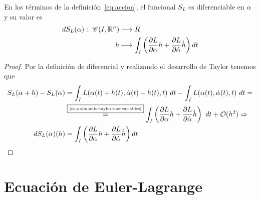\begin{theorem}
    En los términos de la definición~\eqref{eq:accion}, el funcional $S_L$ es diferenciable en $\alpha$ y su valor es
    \begin{equation}
        \label{eq:accion_diferencial}
        \begin{align}
            dS_L(\alpha):\ \mathscr{C}(I, \mathbb{R}^n) & \longrightarrow R \\ h & \longmapsto \int_{I}\left( \frac{\partial L}{\partial\alpha}h+\frac{\partial L}{\partial\dot{\alpha}}\dot{h}\right) dt
        \end{align}
    \end{equation}
\end{theorem}
\begin{proof}
    Por la definición de diferencial y realizando el desarrollo de Taylor tenemos que
    \begin{equation*}
        \begin{split}
            S_L(\alpha + h) -  S_L(\alpha)& = \int_{I}L(\alpha(t)+h(t), \dot{\alpha}(t)+\dot{h}(t), t)\ dt - \int_{I}L(\alpha(t), \dot{\alpha}(t), t)\ dt =\\
            &\overset{\fbox{\tiny \ref{eq:polinomio-taylor-dos-variables}}}{=}\int_{I}\left( \frac{\partial L}{\partial\alpha}h+\frac{\partial L}{\partial\dot{\alpha}}\dot{h}\right)\ dt+\mathcal{O}(h^2)\Rightarrow\\
            dS_L(\alpha)(h) &=\int_{I}\left( \frac{\partial L}{\partial\alpha}h+\frac{\partial L}{\partial\dot{\alpha}}\dot{h}\right) dt
        \end{split}
    \end{equation*}
\end{proof}


\section{Ecuación de Euler-Lagrange}


